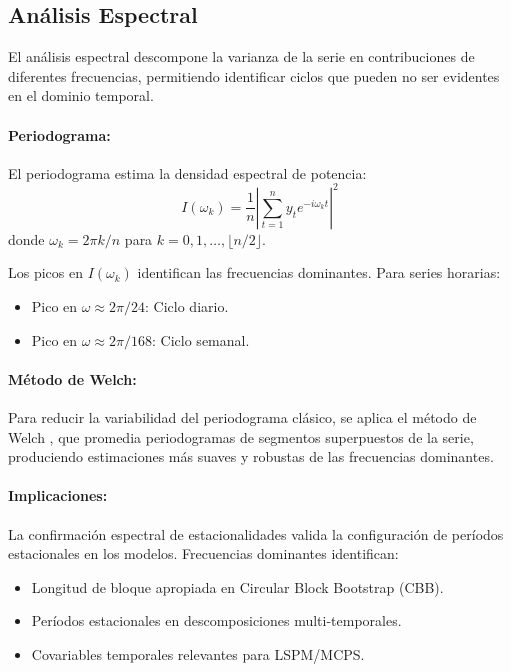 \subsection{Análisis Espectral}
\label{subsec:eda_espectral}

El análisis espectral descompone la varianza de la serie en contribuciones de diferentes frecuencias, permitiendo identificar ciclos que pueden no ser evidentes en el dominio temporal.

\paragraph{Periodograma:} El periodograma estima la densidad espectral de potencia:
\begin{equation}
I(\omega_k) = \frac{1}{n} \left| \sum_{t=1}^{n} y_t e^{-i \omega_k t} \right|^2
\label{eq:periodograma}
\end{equation}
donde $\omega_k = 2\pi k / n$ para $k = 0, 1, \ldots, \lfloor n/2 \rfloor$.

Los picos en $I(\omega_k)$ identifican las frecuencias dominantes. Para series horarias:
\begin{itemize}
\item Pico en $\omega \approx 2\pi/24$: Ciclo diario.
\item Pico en $\omega \approx 2\pi/168$: Ciclo semanal.
\end{itemize}

\paragraph{Método de Welch:} Para reducir la variabilidad del periodograma clásico, se aplica el método de Welch \parencite{Welch1967}, que promedia periodogramas de segmentos superpuestos de la serie, produciendo estimaciones más suaves y robustas de las frecuencias dominantes.

\paragraph{Implicaciones:} La confirmación espectral de estacionalidades valida la configuración de períodos estacionales en los modelos. Frecuencias dominantes identifican:
\begin{itemize}
\item Longitud de bloque apropiada en Circular Block Bootstrap (CBB).
\item Períodos estacionales en descomposiciones multi-temporales.
\item Covariables temporales relevantes para LSPM/MCPS.
\end{itemize}

